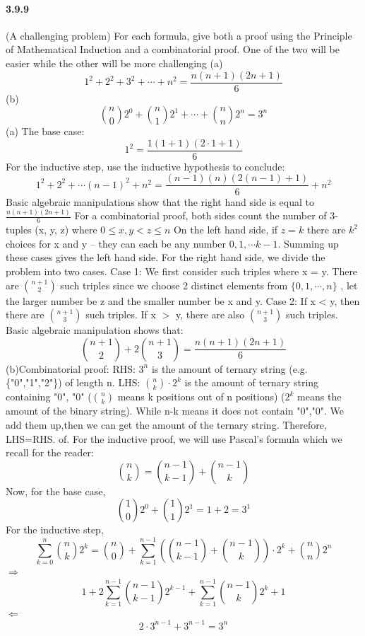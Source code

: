 \documentclass{article}
\begin{document}
\paragraph{3.9.9}(A challenging problem) For each formula, give both a proof using the Principle of
Mathematical Induction and a combinatorial proof. One of the two will be easier while
the other will be more challenging \newline
(a)$$1^2+2^2+3^2+\cdots +n^2=\frac{n(n+1)(2n+1)}{6}$$
(b)$$\binom{n}{0}2^0+\binom{n}{1}2^1+\cdots +\binom{n}{n}2^n=3^n$$
(a) The base case:\newline
$$1^2=\frac{1(1+1)(2\cdot 1+1)}{6}$$
For the inductive step, use the inductive hypothesis to conclude:
$$1^2+2^2+\cdots (n-1)^2+n^2=\frac{(n-1)(n)(2(n-1)+1)}{6}+n^2$$
Basic algebraic manipulations show that the right hand side is equal to $\frac{n(n+1)(2n+1)}{6}$ For a
combinatorial proof, both sides count the number of 3-tuples (x, y, z) where $0\leq x,y<z\leq n$ On the left hand side, if $z=k$ there are $k^2$ choices for x and y – they can each be any number $0,1,\cdots k-1$. Summing up these cases gives the left hand side. For the right hand
side, we divide the problem into two cases.\newline
Case 1: We first consider such triples where x = y. There are $\binom{n+1}{2}$ such triples since we choose 2 distinct elements from $\{0,1,\cdots ,n\}$ , let the larger number be z and the smaller number be x and y.
Case 2:  If x < y, then there are $\binom{n+1}{3}$ such triples. If x $>$ y, there are also $\binom{n+1}{3}$ such triples. Basic algebraic manipulation shows that:
$$\binom{n+1}{2}+2 \binom{n+1}{3}=\frac{n(n+1)(2n+1)}{6}$$
(b)Combinatorial proof:\newline
RHS: $3^n$ is the amount of ternary string (e.g.\{"0","1","2"\}) of length n.\newline
LHS: $\binom{n}{k}\cdot 2^k$ is the amount of ternary string containing "0", "0" ($\binom{n}{k}$ means k positions out of n positions) ($2^k$ means the amount of the binary string). While n-k means it does not contain "0","0". We add them up,then we can get the amount of the ternary string.\newline
Therefore, LHS=RHS.\newline
of. For the inductive proof, we will use Pascal’s formula which we recall for the reader:
$$\binom{n}{k}=\binom{n-1}{k-1}+\binom{n-1}{k}$$
Now, for the base case,
$$\binom{1}{0}2^0+\binom{1}{1}2^1=1+2=3^1$$
For the inductive step,
$$\sum_{k=0}^{n}\binom{n}{k}2^k=\binom{n}{0}+\sum^{n-1}_{k=1}(\binom{n-1}{k-1}+\binom{n-1}{k})\cdot 2^k+\binom{n}{n}2^n$$
$\Longrightarrow$
$$1+2\sum_{k=1}^{n-1}\binom{n-1}{k-1}2^{k-1}+\sum_{k=1}^{n-1}\binom{n-1}{k}2^k+1$$
$\Longleftarrow$
$$2\cdot 3^{n-1}+3^{n-1}=3^n$$
\end{document}

